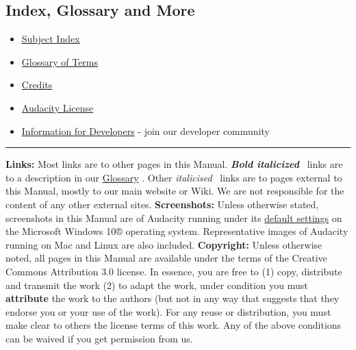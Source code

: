 \begin{multicols}{2}
\section{Index, Glossary and More}
\begin{itemize}
\item 
\hyperref[\foo{manXsubjectXindexX}]{Subject Index}

\item 
\hyperref[\foo{manXglossaryX}]{Glossary of Terms}

\item 
\hyperref[\foo{manXcreditsX}]{Credits}

\end{itemize}

\begin{itemize}
\item 
\hyperref[\foo{manXlicenseX}]{Audacity License}

\item 
\hyperref[\foo{manXinformationXforXdevelopersX}]{Information for Developers}
 - join our developer community
\end{itemize}

\label{indexXmiscXbottom}\vspace{1mm}\hrule \textbf{Links:} Most links are to other pages in this Manual. \textit{\textbf{Bold italicized}}  links are to a description in our 
\hyperref[\foo{manXglossaryX}]{Glossary}
. Other \textit{italicised}  links are to pages external to this Manual, mostly to our main website or Wiki. We are not responsible for the content of any other external sites.    
\textbf{Screenshots:} Unless otherwise stated, screenshots in this Manual are of Audacity running 
under its 
\hyperref[\foo{manXpreferencesXstored}]{default settings}
 on the Microsoft Windows 10® operating system. Representative images of Audacity running on Mac and Linux are also included. 
\textbf{Copyright:} Unless otherwise noted, all pages in this Manual are available under the terms of the Creative Commons Attribution 3.0 license. In essence, you are free to (1) copy, distribute and transmit the work (2) to adapt the work, under condition you must \textbf{attribute} the work to the authors (but not in any way that suggests that they endorse you or your use of the work). For any reuse or distribution, you must make clear to others the license terms of this work. Any of the above conditions can be waived if you get permission from us.
\end{multicols}